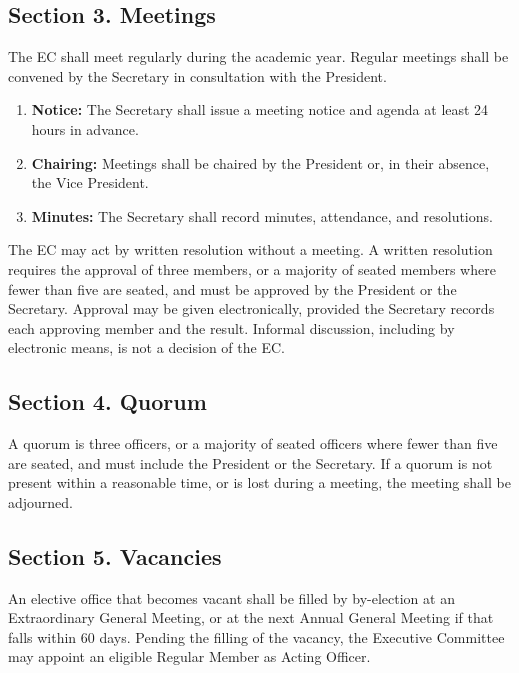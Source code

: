 \documentclass[a4paper]{article}
\begin{document}
\subsection*{Section 3. Meetings}
The EC shall meet regularly during the academic year. Regular meetings shall be convened by the Secretary in consultation with the President.

\begin{enumerate}
  \item \textbf{Notice:} The Secretary shall issue a meeting notice and agenda at least 24 hours in advance.
  \item \textbf{Chairing:} Meetings shall be chaired by the President or, in their absence, the Vice President.
  \item \textbf{Minutes:} The Secretary shall record minutes, attendance, and resolutions.
\end{enumerate}

The EC may act by written resolution without a meeting. A written resolution requires the approval of three members, or a majority of seated members where fewer than five are seated, and must be approved by the President or the Secretary. Approval may be given electronically, provided the Secretary records each approving member and the result. Informal discussion, including by electronic means, is not a decision of the EC.

\subsection*{Section 4. Quorum}
A quorum is three officers, or a majority of seated officers where fewer than five are seated, and must include the President or the Secretary. If a quorum is not present within a reasonable time, or is lost during a meeting, the meeting shall be adjourned.

\subsection*{Section 5. Vacancies }

An elective office that becomes vacant shall be filled by by-election at an Extraordinary General Meeting, or at the next Annual General Meeting if that falls within 60 days. Pending the filling of the vacancy, the Executive Committee may appoint an eligible Regular Member as Acting Officer.
\end{document}
